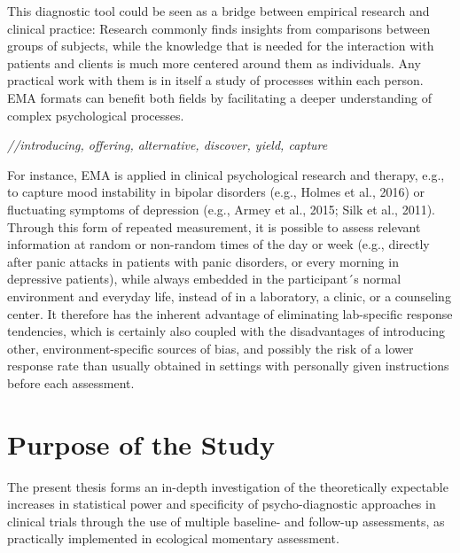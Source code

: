 \documentclass[12pt,twoside]{reedthesis}
\begin{document}
\par

This diagnostic tool could be seen as a bridge between empirical research and clinical practice: Research commonly finds insights from comparisons between groups of subjects, while the knowledge that is needed for the interaction with patients and clients is much more centered around them as individuals. Any practical work with them is in itself a study of processes within each person. EMA formats can benefit both fields by facilitating a deeper understanding of complex psychological processes.

\par

\emph{//introducing, offering, alternative, discover, yield, capture}

\par

For instance, EMA is applied in clinical psychological research and therapy, e.g., to capture mood instability in bipolar disorders (e.g., Holmes et al., 2016) or fluctuating symptoms of depression (e.g., Armey et al., 2015; Silk et al., 2011). Through this form of repeated measurement, it is possible to assess relevant information at random or non-random times of the day or week (e.g., directly after panic attacks in patients with panic disorders, or every morning in depressive patients), while always embedded in the participant´s normal environment and everyday life, instead of in a laboratory, a clinic, or a counseling center. It therefore has the inherent advantage of eliminating lab-specific response tendencies, which is certainly also coupled with the disadvantages of introducing other, environment-specific sources of bias, and possibly the risk of a lower response rate than usually obtained in settings with personally given instructions before each assessment.

\par

\hypertarget{purpose-of-the-study}{%
\section{Purpose of the Study}\label{purpose-of-the-study}}

The present thesis forms an in-depth investigation of the theoretically expectable increases in statistical power and specificity of psycho-diagnostic approaches in clinical trials through the use of multiple baseline- and follow-up assessments, as practically implemented in ecological momentary assessment.
\end{document}
